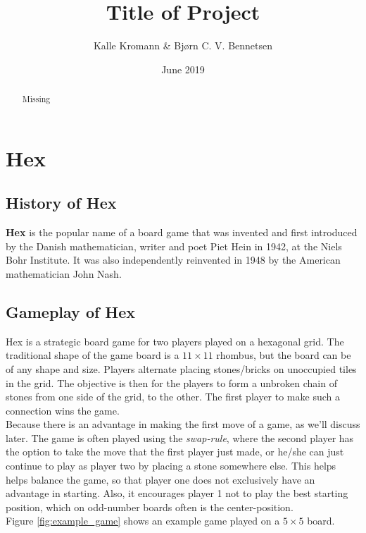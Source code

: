 \documentclass[a4paper]{article}
\title{Title of Project}
\author{Kalle Kromann \& Bjørn C. V. Bennetsen}
\date{June 2019}
\begin{document}
\maketitle
\begin{abstract}
Missing
\end{abstract}



\section{Hex}
\subsection{History of Hex}
\textbf{Hex} is the popular name of a board game that was invented and first introduced by the Danish mathematician, writer and poet Piet Hein in 1942, at the Niels Bohr Institute. 
It was also independently reinvented in 1948 by the American mathematician John Nash. 

\subsection{Gameplay of Hex}
Hex is a strategic board game for two players played on a hexagonal grid. 
The traditional shape of the game board is a $11\times11$ rhombus, but the board can be of any shape and size.
Players alternate placing stones/bricks on unoccupied tiles in the grid. The objective is then for the players to form a unbroken chain of stones from one side of the grid, to the other. The first player to make such a connection wins the game. \\
Because there is an advantage in making the first move of a game, as we'll discuss later. The game is often played using the \emph{swap-rule}, where the second player has the option to take the move that the first player just made, or he/she can just continue to play as player two by placing a stone somewhere else. This helps helps balance the game, so that player one does not exclusively have an advantage in starting. Also, it encourages player 1 not to play the best starting position, which on odd-number boards often is the center-position. \\
Figure \ref{fig:example_game} shows an example game played on a $5\times5$ board.
\end{document}
